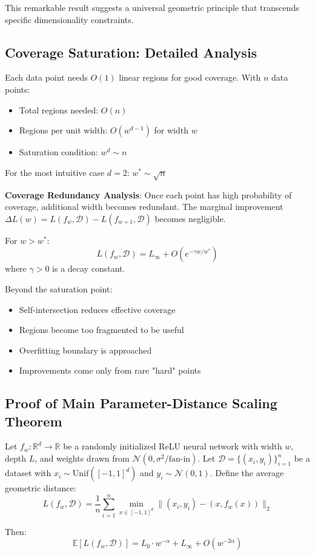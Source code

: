 This remarkable result suggests a universal geometric principle that transcends specific dimensionality constraints.

\subsection{Coverage Saturation: Detailed Analysis}
\label{subsec:coverage-saturation-detailed}

\begin{lemma}
Each data point needs $O(1)$ linear regions for good coverage. With $n$ data points:
\begin{itemize}
    \item Total regions needed: $O(n)$
    \item Regions per unit width: $O(w^{d-1})$ for width $w$
    \item Saturation condition: $w^d \sim n$
\end{itemize}
For the most intuitive case $d = 2$: $w^* \sim \sqrt{n}$
\end{lemma}

\textbf{Coverage Redundancy Analysis}: Once each point has high probability of coverage, additional width becomes redundant. The marginal improvement $\Delta L(w) = L(f_w, \mathcal{D}) - L(f_{w+1}, \mathcal{D})$ becomes negligible.

\begin{theorem}
For $w > w^*$:
$$L(f_w, \mathcal{D}) = L_\infty + O(e^{-\gamma w/w^*})$$
where $\gamma > 0$ is a decay constant.
\end{theorem}

Beyond the saturation point:
\begin{itemize}
    \item Self-intersection reduces effective coverage
    \item Regions become too fragmented to be useful
    \item Overfitting boundary is approached
    \item Improvements come only from rare "hard" points
\end{itemize}

\subsection{Proof of Main Parameter-Distance Scaling Theorem}
\label{subsec:main-theorem-proof}

\begin{theorem}
Let $f_w: \mathbb{R}^d \to \mathbb{R}$ be a randomly initialized ReLU neural network with width $w$, depth $L$, and weights drawn from $\mathcal{N}(0, \sigma^2/\text{fan-in})$. Let $\mathcal{D} = \{(x_i, y_i)\}_{i=1}^n$ be a dataset with $x_i \sim \text{Unif}([-1,1]^d)$ and $y_i \sim \mathcal{N}(0,1)$. Define the average geometric distance:
$$L(f_w, \mathcal{D}) = \frac{1}{n} \sum_{i=1}^n \min_{x \in [-1,1]^d} \|(x_i, y_i) - (x, f_w(x))\|_2$$

Then:
$$\mathbb{E}[L(f_w, \mathcal{D})] = L_0 \cdot w^{-\alpha} + L_\infty + O(w^{-2\alpha})$$
\end{theorem}

